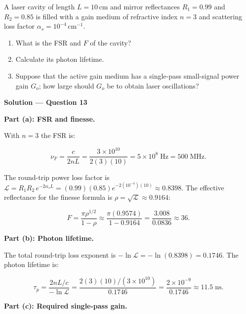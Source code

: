 
\begin{question}[Question 13]A laser cavity of length $L=10$\,cm and mirror reflectances $R_{1}=0.99$
and $R_{2}=0.85$ is filled with a gain medium of refractive index $n=3$ and scattering loss
factor $\alpha_{s}=10^{-4}$\,cm$^{-1}$.
\begin{enumerate}[label=(\alph*)]
  \item What is the FSR and $F$ of the cavity?
  \item Calculate its photon lifetime.
  \item Suppose that the active gain medium has a single-pass small-signal power gain $G_{o}$;
        how large should $G_{o}$ be to obtain laser oscillations?
\end{enumerate}
\end{question}

\textbf{\large Solution --- Question 13}

\textbf{Part (a): FSR and finesse.}

With $n=3$ the FSR is:

\begin{equation*}
  \nu_F = \frac{c}{2nL} = \frac{3\times10^{10}}{2(3)(10)} = \boxed{5\times10^{8}\;\text{Hz} = 500\;\text{MHz}.}
\end{equation*}

The round-trip power loss factor is $\mathcal{L} = R_1 R_2\,e^{-2\alpha_s L} = (0.99)(0.85)e^{-2(10^{-4})(10)} \approx 0.8398$. The effective reflectance for the finesse formula is $\rho = \sqrt{\mathcal{L}} \approx 0.9164$:

\begin{equation*}
  F = \frac{\pi\rho^{1/2}}{1-\rho} \approx \frac{\pi(0.9574)}{1-0.9164} = \frac{3.008}{0.0836} \approx \boxed{36.}
\end{equation*}

\textbf{Part (b): Photon lifetime.}

The total round-trip loss exponent is $-\ln\mathcal{L} = -\ln(0.8398) = 0.1746$. The photon lifetime is:

\begin{equation*}
  \tau_p = \frac{2nL/c}{-\ln\mathcal{L}} = \frac{2(3)(10)/(3\times10^{10})}{0.1746} = \frac{2\times10^{-9}}{0.1746} \approx \boxed{11.5\;\text{ns}.}
\end{equation*}

\textbf{Part (c): Required single-pass gain.}

